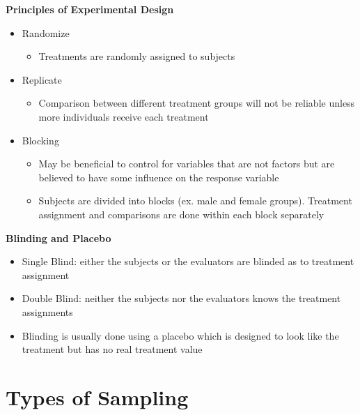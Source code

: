 \documentclass{article}
\begin{document}
\noindent
\textbf{Principles of Experimental Design}
\begin{itemize}
    \item Randomize
    \begin{itemize}
        \item Treatments are randomly assigned to subjects
    \end{itemize}
    \item Replicate
    \begin{itemize}
        \item Comparison between different treatment groups will not be reliable unless more individuals receive each treatment 
    \end{itemize}
    \item Blocking
    \begin{itemize}
        \item May be beneficial to control for variables that are not factors but are believed to have some influence on the response variable 
        \item Subjects are divided into blocks (ex. male and female groups). Treatment assignment and comparisons are done within each block separately 
    \end{itemize}
\end{itemize}

\noindent
\textbf{Blinding and Placebo}
\begin{itemize}
    \item Single Blind: either the subjects or the evaluators are blinded as to treatment assignment
    \item Double Blind: neither the subjects nor the evaluators knows the treatment assignments
    \item Blinding is usually done using a placebo which is designed to look like the treatment but has no real treatment value
\end{itemize}

\section{Types of Sampling}
\end{document}
